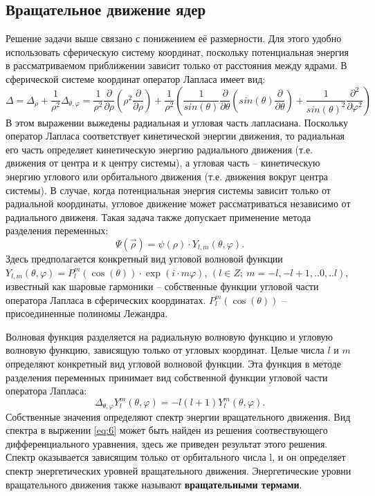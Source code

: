 \documentclass[a4paper, 12pt]{article}
\begin{document}
\subsection{Вращательное движение ядер}
Решение задачи выше связано с понижением её размерности. Для
этого удобно использовать сферическую систему координат, поскольку потенциальная энергия в рассматриваемом приближении зависит
только от расстояния между ядрами. В сферической системе координат оператор Лапласа имеет вид:
\begin{equation}
\Delta=\Delta_\rho+\frac{1}{\rho^2}\Delta_{\theta,\varphi}=\frac{1}{\rho^2}\frac{\partial}{\partial\rho}\left(\rho^2\frac{\partial}{\partial\rho}\right)+\frac{1}{\rho^2}\left(\frac{1}{sin(\theta)}\frac{\partial}{\partial\theta}\left(sin(\theta)\frac{\partial}{\partial\theta}\right)+\frac{1}{sin(\theta)^2}\frac{\partial^2}{\partial\varphi^2}\right)
\end{equation}
В этом выражении выжедены радиальная и угловая часть лапласиана. Поскольку оператор Лапласа соответствует кинетической энергии движения, то радиальная его часть определяет кинетическую энергию радиального движения (т.е. движения от центра и к центру системы), а угловая часть -- кинетическую энергию углового или орбитального движения (т.е. движения вокруг центра системы). В случае, когда потенциальная энергия системы зависит только от радиальной координаты, угловое движение может рассматриваться независимо от радиального движеня. Такая задача также допускает применение метода разделения переменных:
\begin{equation}
	\Psi(\vec{\rho})=\psi(\rho)\cdot Y_{l,m}(\theta,\varphi).
\end{equation}
Здесь предполагается конкретный вид угловой волновой функции $Y_{l,m}(\theta,\varphi)=P_l^m(\cos(\theta))\cdot\exp(i\cdot m\varphi)$, $(l\in Z;\ m=-l,-l+1,..0,..l)$, известный как шаровые гармоники -- собственные функции угловой части оператора Лапласа в сферических координатах. $P_l^m(\cos(\theta))$ -- присоединенные полиномы Лежандра.

Волновая функция разделяется на радиальную волновую функцию и угловую волновую функцию, зависящую только от угловых координат. Целые числа $l$ и $m$ определяют конкретный вид угловой волновой функции. Эта функция в методе разделения переменных принимает вид собственной функции угловой части оператора Лапласа:
\begin{equation}
	\Delta_{\theta,\varphi}Y_l^m(\theta,\varphi)=-l(l+1)Y_l^m(\theta, \varphi).
	\label{eq:6}
\end{equation}
Собственные значения определяют спектр энергии вращательного движения. Вид спектра в выржении \ref{eq:6} может быть найден из решения соотвествующего дифференциального уравнения, здесь же приведен результат этого решения. Спектр оказывается зависящим только от орбитального числа l, и он определяет спектр энергетических уровней вращательного движения. Энергетические уровни вращательного движения также называют \textbf{вращательными термами}.
\end{document}
